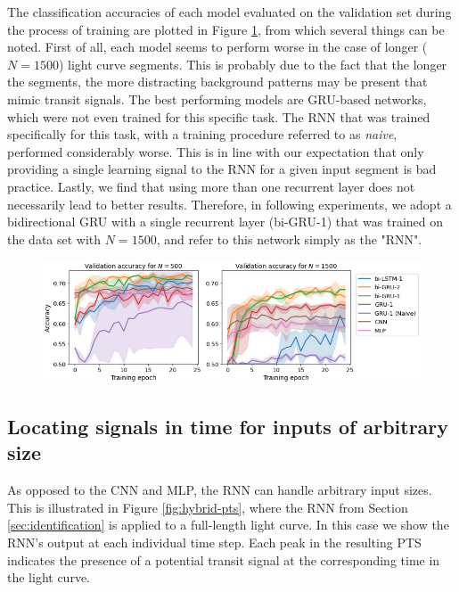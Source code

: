 The classification accuracies of each model evaluated on the validation set during the process of training are plotted in Figure \ref{fig:hybrid-model_comparison}, from which several things can be noted. First of all, each model seems to perform worse in the case of longer ($N=1500$) light curve segments. This is probably due to the fact that the longer the segments, the more distracting background patterns may be present that mimic transit signals. The best performing models are GRU-based networks, which were not even trained for this specific task. The RNN that was trained specifically for this task, with a training procedure referred to as \textit{naive}, performed considerably worse. This is in line with our expectation that only providing a single learning signal to the RNN for a given input segment is bad practice. Lastly, we find that using more than one recurrent layer does not necessarily lead to better results. Therefore, in following experiments, we adopt a bidirectional GRU with a single recurrent layer (bi-GRU-1) that was trained on the data set with $N=1500$, and refer to this network simply as the "RNN".

\begin{figure}
    \centering
    \includegraphics[width=0.8\linewidth]{Experiments/Figures/Hybrid/identification_models.png}
    \caption{}
    \label{fig:hybrid-model_comparison}
\end{figure}

\subsection{Locating signals in time for inputs of arbitrary size}

As opposed to the CNN and MLP, the RNN can handle arbitrary input sizes. This is illustrated in Figure \ref{fig:hybrid-pts}, where the RNN from Section \ref{sec:identification} is applied to a full-length light curve. In this case we show the RNN's output at each individual time step. Each peak in the resulting PTS indicates the presence of a potential transit signal at the corresponding time in the light curve. 

